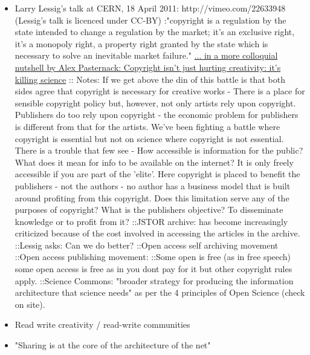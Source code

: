 \documentclass[final,authoryear,3p]{elsarticle-open-drafting}
\begin{document}
\begin{itemize}
	\item  Larry Lessig's talk at CERN, 18 April 2011: http://vimeo.com/22633948 (Lessig's talk is licenced under CC-BY) 
:"copyright is a regulation by the state intended to change a regulation by the market; it's an exclusive right, it's a monopoly right, a property right granted by the state which is necessary to solve an inevitable market failure." \href{http://motherboard.tv/2011/4/25/lessig-copyright-isn-t-just-hurting-creativity-it-s-killing-science-video--2}{ ... in a more colloquial nutshell by Alex Pasternack: Copyright isn't just hurting creativity: it's killing science} 
:: Notes: If we get above the din of this battle is that both sides agree that copyright is necessary for creative works - There is a place for sensible copyright policy but, however, not only artists rely upon copyright. Publishers do too rely upon copyright - the economic problem for publishers is different from that for the artists. We've been fighting a battle where copyright is essential but not on science where copyright is not essential. There is a trouble that few see - How accessible is information for the public? What does it mean for info to be available on the internet? It is only freely accessible if you are part of the 'elite'. Here copyright is placed to benefit the publishers - not the authors - no author has a business model that is built around profiting from this copyright. Does this limitation serve any of the purposes of copyright? What is the publishers objective? To disseminate knowledge or to profit from it? 
::JSTOR archive: has become increasingly criticized because of the cost involved in accessing the articles in the archive. 
::Lessig asks: Can we do better? 
::Open access self archiving movement
::Open access publishing movement:
::Some open is free (as in free speech) some open access is free as in you dont pay for it but other copyright rules apply.
::Science Commons: "broader strategy for producing the information architecture that science needs" as per the 4 principles of Open Science (check on site).
	\item Read write creativity / read-write communities
	\item "Sharing is at the core of the architecture of the net"

\end{itemize}
\end{document}
